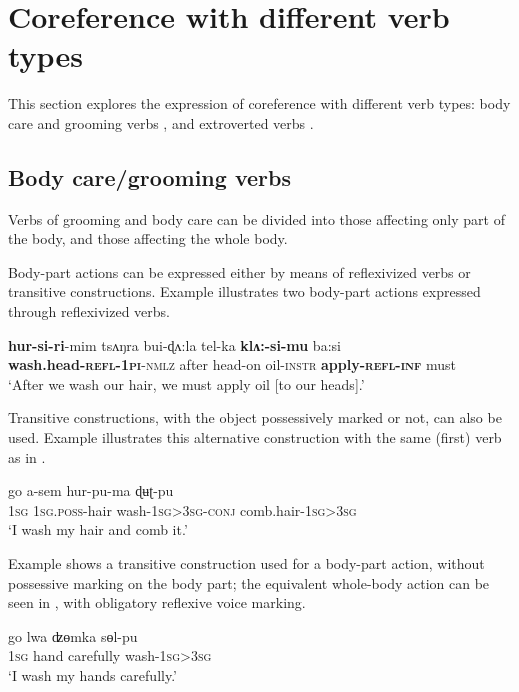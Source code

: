 \documentclass[output=paper]{langscibook}
\begin{document}
\section{Coreference with different verb types}
\label{sec:Lahaussois:4}

This section explores the expression of coreference with different verb types: body care and grooming verbs , and extroverted verbs .

\subsection{Body care/grooming verbs}
\label{sec:Lahaussois:4.1}

Verbs of grooming and body care can be divided into those affecting only part of the body, and those affecting the whole body.

Body-part actions can be expressed either by means of reflexivized verbs or transitive constructions. Example  illustrates two body-part actions expressed through reflexivized verbs. 

\ea%
    \label{ex:Lahaussois:23}
    \gll \textbf{hur-si-ri}-mim tsʌŋra  bui-ɖʌ:la tel-ka \textbf{klʌ:-si-mu} ba:si\\
        \textbf{wash.head-\textsc{refl-1pi}}\textsc{{}-nmlz} after head-on oil-\textsc{instr} \textbf{apply-\textsc{refl-inf}} must\\
    \glt ‘After we wash our hair, we must apply oil [to our heads].'
    \z

Transitive constructions, with the object possessively marked or not, can also be used. Example  illustrates this alternative construction with the same (first) verb as in .

\ea%
    \label{ex:Lahaussois:24}
    \gll go a-sem hur-pu-ma ɖʉʈ-pu\\
        \textsc{1sg} \textsc{1sg.poss}{}-hair wash-\textsc{1sg>3sg-conj}   comb.hair-\textsc{1sg>3sg}\\
    \glt ‘I wash my hair and comb it.'
    \z

Example  shows a transitive construction used for a body-part action, without possessive marking on the body part; the equivalent whole-body action can be seen in , with obligatory reflexive voice marking.

\ea%
    \label{ex:Lahaussois:25}
    \gll go lwa ʣɵmka sɵl-pu\\
        1\textsc{sg} hand carefully wash-1\textsc{sg}>3\textsc{sg}\\
    \glt ‘I wash my hands carefully.'
    \z
\end{document}
